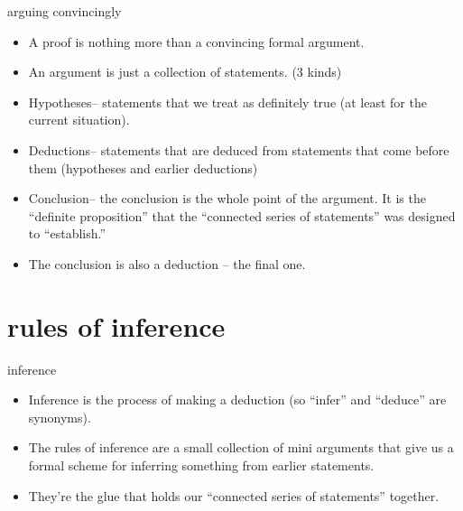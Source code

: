 \documentclass[landscape]{beamer}
\begin{document}
\begin{frame}{arguing convincingly}
\begin{itemize}
\item A proof is nothing more than a convincing formal argument. \pause
\item An argument is just a collection of statements. \pause (3 kinds) \pause
\item Hypotheses\pause -- statements that we treat as definitely true (at least for the current situation). \pause
\item Deductions\pause -- statements that are deduced from statements that come before them (hypotheses and earlier deductions) \pause
\item Conclusion\pause -- the conclusion is the whole point of the argument.  It is the ``definite proposition'' that the ``connected series of statements'' was designed to ``establish.'' \pause
\item The conclusion is also a deduction -- the final one.
\end{itemize}
\end{frame}

\section{rules of inference}

\begin{frame}{inference}
\begin{itemize}
\item Inference is the process of making a deduction \pause (so ``infer'' and ``deduce'' are synonyms). \pause
\item The rules of inference are a small collection of mini arguments that give us a formal scheme for inferring something from earlier statements. \pause
\item They're the glue that holds our ``connected series of statements'' together.
\end{itemize}
\end{frame}
\end{document}
